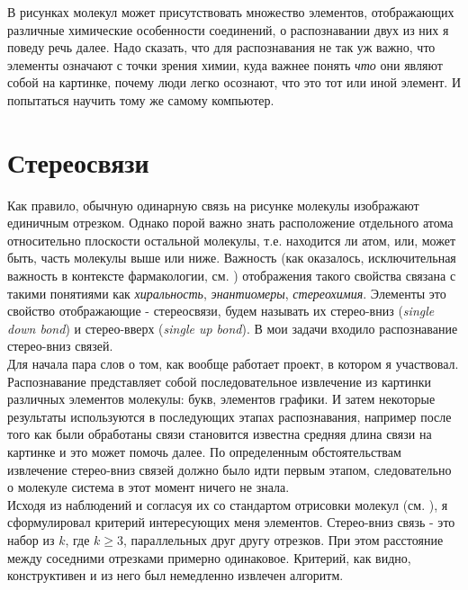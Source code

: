 \noindent
В рисунках молекул может присутствовать множество элементов, отображающих различные химические особенности соединений,
о распознавании двух из них я поведу речь далее. Надо сказать, что для распознавания не так уж важно, что элементы означают с точки 
зрения химии, куда важнее понять \emph{что} они являют собой на картинке, почему люди легко осознают, что это тот или 
иной элемент. И попытаться научить тому же самому компьютер. 

\section*{Стереосвязи}

Как правило, обычную одинарную связь на рисунке молекулы изображают единичным отрезком. Однако порой важно знать расположение
отдельного атома относительно плоскости остальной молекулы, т.е. находится ли атом, или, может быть, часть молекулы выше или ниже.
Важность (как оказалось, исключительная важность в контексте фармакологии, см. \cite{chirality}) отображения такого свойства 
связана с такими понятиями как \emph{хиральность}, \emph{энантиомеры}, \emph{стереохимия}. Элементы это свойство отображающие - 
стереосвязи, будем называть их стерео-вниз (\emph{single down bond}) и стерео-вверх (\emph{single up bond}). В мои задачи 
входило распознавание стерео-вниз связей. \\

\noindent
Для начала пара слов о том, как вообще работает проект, в котором я участвовал. Распознавание представляет собой последовательное
извлечение из картинки различных элементов молекулы: букв, элементов графики. И затем некоторые результаты используются в последующих
этапах распознавания, например после того как были обработаны связи становится известна средняя длина связи на картинке и это может помочь далее.
По определенным обстоятельствам извлечение стерео-вниз связей должно было идти первым этапом, следовательно о молекуле система в этот
момент ничего не знала. \\

\noindent
Исходя из наблюдений и согласуя их со стандартом отрисовки молекул (см. \cite{iupac}), я сформулировал критерий интересующих меня
элементов. Стерео-вниз связь - это набор из $k$, где $k \ge 3$, параллельных друг другу отрезков. При этом расстояние между
соседними отрезками примерно одинаковое. Критерий, как видно, конструктивен и из него был немедленно извлечен алгоритм.  

